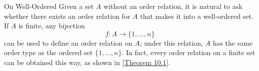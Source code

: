 \begin{remarkBox}{On Well-Ordered}
    Given a set \( A \) without an order relation, it is natural to ask whether there
    exists an order relation for \( A \) that makes it into a well-ordered set.
    If \( A \) is finite, any bijection
    \begin{equation*}
        f: A \rightarrow \{ 1, \ldots, n \}
    \end{equation*}
    can be used to define an order relation on \( A \); under this relation, \( A \) 
    has the same order type as the ordered set \( \{ 1 , \ldots , n \} \).
    In fact, every order relation on a finite set can be obtained this way, as shown in
    [\hyperlink{thm:10.1}{Theorem 10.1}].
\end{remarkBox}
